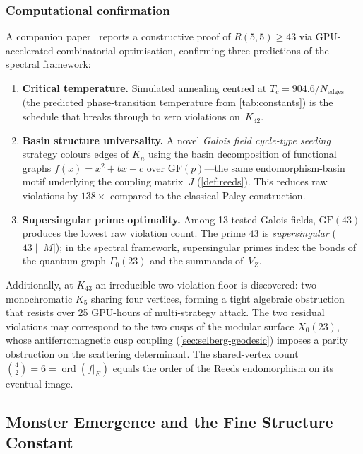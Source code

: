 \documentclass[11pt,a4paper]{article}
\theoremstyle{plain}
\theoremstyle{remark}
\newcommand{\ord}{\operatorname{ord}}
\begin{document}
\subsubsection{Computational confirmation}
A companion paper~\cite{daugherty-ramsey2026} reports a constructive
proof of $R(5,5)\geq 43$ via GPU-accelerated combinatorial
optimisation, confirming three predictions of the spectral framework:
\begin{enumerate}[nosep]
  \item \textbf{Critical temperature.}
        Simulated annealing centred at
        $T_c = 904.6/N_{\mathrm{edges}}$ (the predicted phase-transition
        temperature from \cref{tab:constants}) is the schedule that
        breaks through to zero violations on~$K_{42}$.
  \item \textbf{Basin structure universality.}
        A novel \emph{Galois field cycle-type seeding} strategy colours
        edges of $K_n$ using the basin decomposition of functional
        graphs $f(x)=x^2+bx+c$ over $\mathrm{GF}(p)$---the same
        endomorphism-basin motif underlying the coupling matrix~$J$
        (\cref{def:reeds}).  This reduces raw violations by
        $138\times$ compared to the classical Paley construction.
  \item \textbf{Supersingular prime optimality.}
        Among 13 tested Galois fields, $\mathrm{GF}(43)$ produces the
        lowest raw violation count.  The prime $43$ is
        \emph{supersingular} ($43\mid|M|$); in the spectral
        framework, supersingular primes index the bonds of the quantum
        graph $\Gamma_0(23)$ and the summands of~$V_Z$.
\end{enumerate}
Additionally, at $K_{43}$ an irreducible two-violation floor is
discovered: two monochromatic $K_5$ sharing four vertices, forming a
tight algebraic obstruction that resists over 25 GPU-hours of
multi-strategy attack.  The two residual violations may correspond to
the two cusps of the modular surface $X_0(23)$, whose
antiferromagnetic cusp coupling
(\cref{sec:selberg-geodesic}) imposes a parity
obstruction on the scattering determinant.  The shared-vertex count
$\binom{4}{2}=6=\ord(f|_E)$ equals the order of the Reeds
endomorphism on its eventual image.

\subsection{Monster Emergence and the Fine Structure Constant}
\label{sec:emergence}
\end{document}
